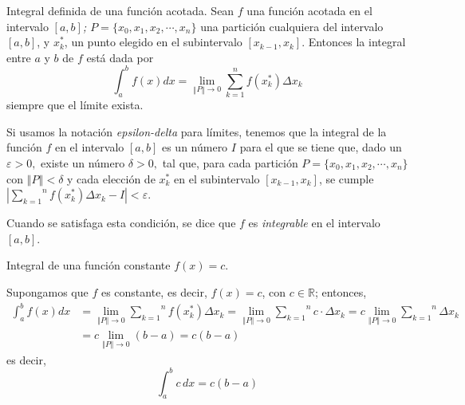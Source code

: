 
\begin{defi}
\textnormal{Integral definida de una función acotada. Sean \textit{$f$} una función acotada en el intervalo \textit{$[a,b]$; $P=\{x_{0},x_{1},x_{2},\cdots ,x_{n}\}$} una partición cualquiera del intervalo \textit{$[a,b]$}, y \textit{$x_{k}^{\ast }$}, un punto elegido en el subintervalo \textit{$\left[x_{k-1},x_{k}\right]$}. Entonces la integral entre $a$ y $b$ de $f$ está dada por}
\begin{equation}\label{defintegral}
\int_{a}^{b}f(x)dx=\underset{\left\Vert P\right\Vert \rightarrow 0}{\lim }
\overset{n}{\underset{k=1}{\sum }}f(x_{k}^{\ast })\Delta x_{k}
\end{equation}
\textnormal{siempre que el límite exista.}
\end{defi}


Si usamos la notación \textit{epsilon-delta} para límites, tenemos
que la integral de la función $f$ en el intervalo $[a,b]$ es un número $I$ para el que se tiene que, dado un $\varepsilon >0,$ existe un número $\delta >0,$ tal que, para cada partición $P=\{x_{0},x_{1},x_{2},\cdots ,x_{n}\}$ con $\left\Vert
P\right\Vert <\delta $ y cada elección de $x_{k}^{\ast }$ en el
subintervalo $\left[ x_{k-1},x_{k}\right]$, se cumple $\left\vert \overset{n}{\underset{k=1}{\sum }}f(x_{k}^{\ast })\Delta x_{k}-I\right\vert
<\varepsilon .$

Cuando se satisfaga esta condición, se dice que $f$ es \textit{integrable}
en el intervalo $[a,b]$.

\begin{ejemplo}
\textnormal{Integral de una función constante} $f(x)=c$.
\end{ejemplo}
Supongamos que $f$ es constante, es decir, $f(x)=c$, con $c\in\mathbb{R}$; entonces,
\begin{align*}
\int_{a}^{b}f(x)dx&=\underset{\left\Vert P\right\Vert \rightarrow 0}{\lim }%
\overset{n}{\underset{k=1}{\sum }}f(x_{k}^{\ast })\Delta x_{k}
=\underset{\left\Vert P\right\Vert \rightarrow 0}{\lim }\overset{n}{\underset{k=1}{\sum
}}c\cdot \Delta x_{k}=c\underset{\left\Vert P\right\Vert \rightarrow 0}{\lim }\overset{n}{\underset{k=1}{\sum
}}\Delta x_{k}\\
&=c\underset{\left\Vert P\right\Vert \rightarrow 0}{\lim }
\left( b-a\right)=c\left( b-a\right)
\end{align*}
es decir,
\[
\int_{a}^{b} c\,dx = c(b-a)
\]

